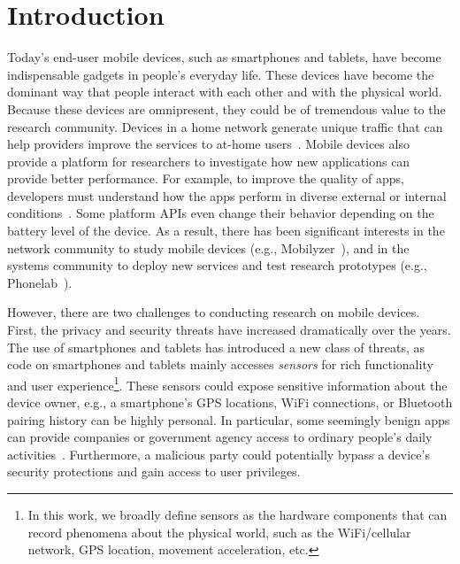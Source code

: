 \section{Introduction}

Today's end-user mobile devices, such as smartphones and
tablets, have become indispensable gadgets in people's everyday
life. These devices have become the dominant way that 
people interact with each other and with the physical world. Because 
these devices are omnipresent, they could be of tremendous value to 
the research community. Devices in a home network generate 
unique traffic that can help providers improve the services to at-home 
users~\cite{sundaresan2011broadband}.
Mobile devices also provide a platform for researchers to
investigate how new applications can provide better performance.
For example, to improve the quality of apps, developers must 
understand how the apps perform in diverse external or internal
conditions~\cite{ravindranath2012appinsight}. Some platform
APIs even change their behavior depending on the battery level
of the device.
As a result, there has been significant interests in the network
community to study mobile devices
(e.g., Mobilyzer~\cite{nikravesh2015mobilyzer}), and in the
systems community to deploy new services and test research
prototypes (e.g., Phonelab~\cite{phonelab, nandugudi2013phonelab}).  
					
However, there are two challenges to conducting research
on mobile devices. First, the privacy and security threats
have increased dramatically over the years. The use of 
smartphones and tablets has introduced a new class of threats, 
as code on smartphones and tablets mainly accesses
\textit{sensors} for rich functionality and user experience\footnote{\scriptsize In 
this work, we broadly define sensors as the hardware components 
that can record phenomena about the physical world, such as the 
WiFi/cellular network, GPS location, movement acceleration, etc.}. 
These sensors could expose sensitive information about the device 
owner, e.g., a smartphone's GPS locations,
WiFi connections, or Bluetooth pairing history can be highly
personal. In particular, some seemingly benign apps can provide 
companies or government agency access to ordinary 
people's daily activities~\cite{AngryBirds}. Furthermore, 
a malicious party could potentially bypass a
device's security protections and gain access to user privileges. 

